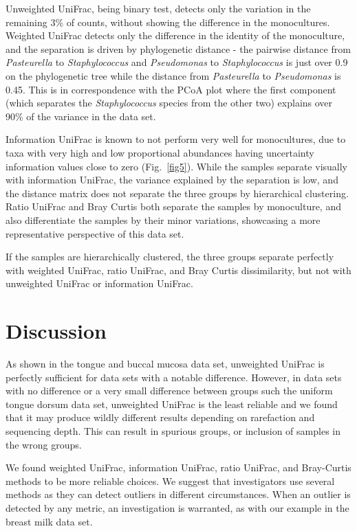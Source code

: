 \documentclass[10pt,letterpaper]{article}
\begin{document}
Unweighted UniFrac, being binary test, detects only the variation in the remaining 3\% of counts, without showing the difference in the monocultures. Weighted UniFrac detects only the difference in the identity of the monoculture, and the separation is driven by phylogenetic distance - the pairwise distance from \textit{Pasteurella} to \textit{Staphylococcus} and \textit{Pseudomonas} to \textit{Staphylococcus} is just over 0.9 on the phylogenetic tree while the distance from \textit{Pasteurella} to \textit{Pseudomonas} is 0.45. This is in correspondence with the PCoA plot where the first component (which separates the \textit{Staphylococcus} species from the other two) explains over 90\% of the variance in the data set.

Information UniFrac is known to not perform very well for monocultures, due to taxa with very high and low proportional abundances having uncertainty information values close to zero (Fig.~\ref{fig5}). While the samples separate visually with information UniFrac, the variance explained by the separation is low, and the distance matrix does not separate the three groups by hierarchical clustering. Ratio UniFrac and Bray Curtis both separate the samples by monoculture, and also differentiate the samples by their minor variations, showcasing a more representative perspective of this data set.

If the samples are hierarchically clustered, the three groups separate perfectly with weighted UniFrac, ratio UniFrac, and  Bray Curtis dissimilarity, but not with unweighted UniFrac or information UniFrac.

\FloatBarrier

\section*{Discussion}
As shown in the tongue and buccal mucosa data set, unweighted UniFrac is perfectly sufficient for data sets with a notable difference. However, in data sets with no difference or a very small difference between groups such the uniform tongue dorsum data set, unweighted UniFrac is the least reliable and we found that it may produce wildly different results depending on rarefaction and sequencing depth. This can result in spurious groups, or inclusion of samples in the wrong groups.

We found weighted UniFrac, information UniFrac, ratio UniFrac, and Bray-Curtis methods to be more reliable choices. We suggest that investigators use several methods as they can detect outliers in different circumstances. When an outlier is detected by any metric, an investigation is warranted, as with our example in the breast milk data set.
\end{document}
